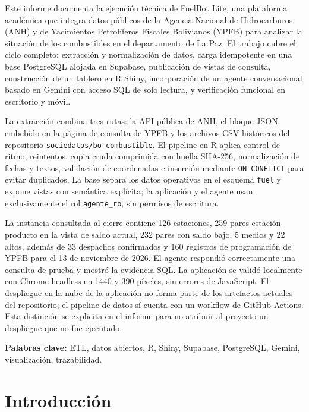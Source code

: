 \documentclass[12pt,a4paper]{article}
\newcommand{\fuel}{\texttt{fuel}}
\begin{document}
Este informe documenta la ejecución técnica de FuelBot Lite, una plataforma académica que integra datos públicos de la Agencia Nacional de Hidrocarburos (ANH) y de Yacimientos Petrolíferos Fiscales Bolivianos (YPFB) para analizar la situación de los combustibles en el departamento de La Paz. El trabajo cubre el ciclo completo: extracción y normalización de datos, carga idempotente en una base PostgreSQL alojada en Supabase, publicación de vistas de consulta, construcción de un tablero en R Shiny, incorporación de un agente conversacional basado en Gemini con acceso SQL de solo lectura, y verificación funcional en escritorio y móvil.

La extracción combina tres rutas: la API pública de ANH, el bloque JSON embebido en la página de consulta de YPFB y los archivos CSV históricos del repositorio \texttt{sociedatos/bo-combustible}. El pipeline en R aplica control de ritmo, reintentos, copia cruda comprimida con huella SHA-256, normalización de fechas y textos, validación de coordenadas e inserción mediante \texttt{ON CONFLICT} para evitar duplicados. La base separa los datos operativos en el esquema \fuel{} y expone vistas con semántica explícita; la aplicación y el agente usan exclusivamente el rol \texttt{agente\_ro}, sin permisos de escritura.

La instancia consultada al cierre contiene 126 estaciones, 259 pares estación-producto en la vista de saldo actual, 232 pares con saldo bajo, 5 medios y 22 altos, además de 33 despachos confirmados y 160 registros de programación de YPFB para el 13 de noviembre de 2026. El agente respondió correctamente una consulta de prueba y mostró la evidencia SQL. La aplicación se validó localmente con Chrome headless en 1440 y 390 píxeles, sin errores de JavaScript. El despliegue en la nube de la aplicación no forma parte de los artefactos actuales del repositorio; el pipeline de datos sí cuenta con un workflow de GitHub Actions. Esta distinción se explicita en el informe para no atribuir al proyecto un despliegue que no fue ejecutado.

\textbf{Palabras clave:} ETL, datos abiertos, R, Shiny, Supabase, PostgreSQL, Gemini, visualización, trazabilidad.

\newpage
\tableofcontents
\newpage
{}

\section{Introducción}
\end{document}
